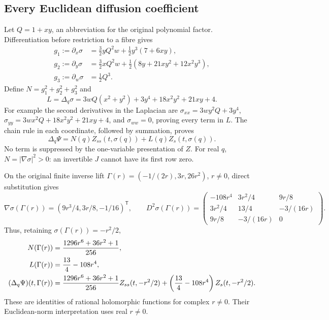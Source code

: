 \subsection{Every Euclidean diffusion coefficient}

Let $Q=1+xy$, an abbreviation for the original polynomial factor.
Differentiation before restriction to a fibre gives
\begin{align*}
g_1:=\partial_x\sigma&=\tfrac32 yQ^2w+
                           \tfrac12y^3(7+6xy),\\
g_2:=\partial_y\sigma&=\tfrac32 xQ^2w+
                           \tfrac12(8y+21xy^2+12x^2y^3),\\
g_3:=\partial_w\sigma&=\tfrac12Q^3.
\end{align*}
Define $N=g_1^2+g_2^2+g_3^2$ and
\[
L=\Delta_q\sigma=3wQ(x^2+y^2)+3y^4+18x^2y^2+21xy+4.
\]
For example the second derivatives in the Laplacian are
$\sigma_{xx}=3wy^2Q+3y^4$,
$\sigma_{yy}=3wx^2Q+18x^2y^2+21xy+4$, and
$\sigma_{ww}=0$, proving every term in $L$.
The chain rule in each coordinate, followed by summation, proves
\begin{equation}
\Delta_q\Psi=N(q)Z_{ss}(t,\sigma(q))+
                    L(q)Z_s(t,\sigma(q)).
\label{eq:eo-euclidean}
\end{equation}
No term is suppressed by the one-variable presentation of $Z$.
For real $q$, $N=|\nabla\sigma|^2>0$: an invertible $J$ cannot
have its first row zero.

On the original finite inverse lift
$\Gamma(r)=(-1/(2r),3r,26r^2)$, $r\ne0$, direct substitution gives
\[
\nabla\sigma(\Gamma(r))=
  (9r^3/4,3r/8,-1/16)^{\mathsf T},\qquad
D^2\sigma(\Gamma(r))=
\begin{pmatrix}
-108r^4&3r^2/4&9r/8\\
3r^2/4&13/4&-3/(16r)\\
9r/8&-3/(16r)&0
\end{pmatrix}.
\]
Thus, retaining $\sigma(\Gamma(r))=-r^2/2$,
\begin{align}
N(\Gamma(r))&=\frac{1296r^6+36r^2+1}{256},\notag\\
L(\Gamma(r))&=\frac{13}{4}-108r^4,\notag\\
(\Delta_q\Psi)(t,\Gamma(r))
 &=\frac{1296r^6+36r^2+1}{256}Z_{ss}(t,-r^2/2)
  +\left(\frac{13}{4}-108r^4\right)Z_s(t,-r^2/2).
\label{eq:eo-on-lift}
\end{align}
These are identities of rational holomorphic functions for complex
$r\ne0$. Their Euclidean-norm interpretation uses real $r\ne0$.

